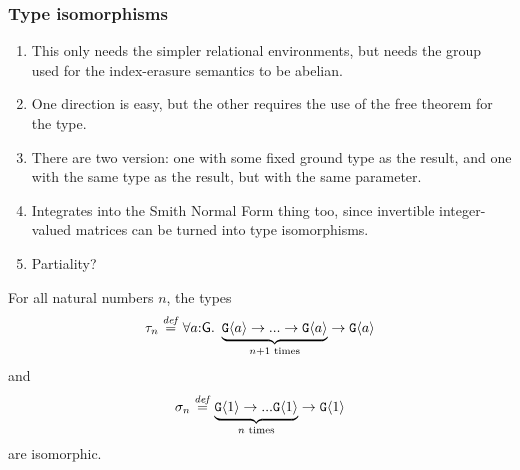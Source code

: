 \subsubsection{Type isomorphisms}
\label{sec:abelian-group-type-isos}

\begin{enumerate}
\item This only needs the simpler relational environments, but needs
  the group used for the index-erasure semantics to be abelian.
\item One direction is easy, but the other requires the use of the
  free theorem for the type.
\item There are two version: one with some fixed ground type as the
  result, and one with the same type as the result, but with the same
  parameter.
\item Integrates into the Smith Normal Form thing too, since
  invertible integer-valued matrices can be turned into type
  isomorphisms.
\item Partiality?
\end{enumerate}


\begin{theorem}
  For all natural numbers $n$, the types
  \begin{displaymath}
    \tau_{n} \stackrel{\mathit{def}}= \forall a\mathord:\mathsf{G}.\ \underbrace{\textup{\texttt{G}}\langle a \rangle \to ... \to \textup{\texttt{G}}\langle a \rangle}_{n+1\textrm{ times}} \to \textup{\texttt{G}}\langle a \rangle
  \end{displaymath}
  and
  \begin{displaymath}
    \sigma_{n} \stackrel{\mathit{def}}= \underbrace{\textup{\texttt{G}}\langle 1 \rangle \to ... \textup{\texttt{G}}\langle 1 \rangle}_{n\textrm{ times}} \to \textup{\texttt{G}}\langle 1 \rangle
  \end{displaymath}
  are isomorphic.
\end{theorem}

